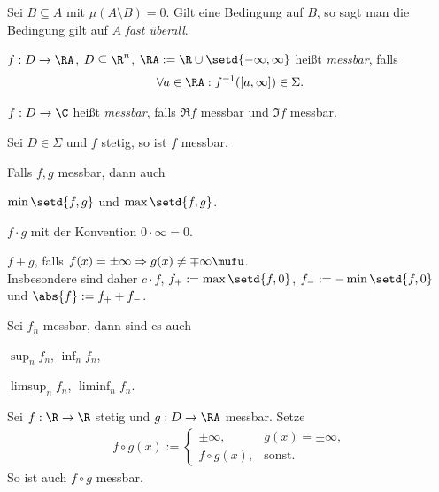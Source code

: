 \begin{defn}
\label{defn:7.8}
Sei $B\subseteq A$ mit $\mu(A\setminus B) = 0$. Gilt eine Bedingung auf $B$, so
sagt man die Bedingung gilt auf $A$ \emph{fast überall}.\fishhere
\end{defn}

\begin{defn}
\label{defn:7.9}
\begin{defnenum}
\item $f: D\to \RA$, $D\subseteq \R^n$, $\RA:=\R\cup\setd{-\infty,\infty}$
heißt \emph{messbar}, falls
\begin{align*}
\forall a\in\RA : f^{-1}([a,\infty]) \in \Sigma.
\end{align*}
\item $f: D\to \C$ heißt \emph{messbar}, falls $\Re f$ messbar und $\Im f$
messbar.\fishhere
\end{defnenum}
\end{defn}

\begin{prop}
\label{prop:7.10}
\begin{propenum}
\item Sei $D\in\Sigma$ und $f$ stetig, so ist $f$ messbar.
\item Falls $f,g$ messbar, dann auch
\begin{defnenum}
\item $\min\setd{f,g}$ und $\max\setd{f,g}$.
\item $f\cdot g$ mit der Konvention $0\cdot \infty = 0$.
\item $f+g$, falls $f(x) = \pm\infty \Rightarrow g(x)\neq \mp \infty \mufu$.\\
Insbesondere sind daher $c\cdot f$, $f_+:=\max\setd{f,0}$, $f_-:=
-\min\setd{f,0}$ und $\abs{f}:= f_++f_-$.
\end{defnenum}
\item Sei $f_n$ messbar, dann sind es auch
\begin{defnenum}
\item $\sup_n f_n$, $\inf_n f_n$,
\item $\limsup_n f_n$, $\liminf_n f_n$.
\end{defnenum}
\item Sei $f:\R\to\R$ stetig und $g: D\to\RA$ messbar. Setze
\begin{align*}
f\circ g(x) :=
\begin{cases}
\pm \infty, & g(x) = \pm\infty,\\
f\circ g(x),& \text{sonst}.
\end{cases}
\end{align*}
So ist auch $f\circ g$ messbar.\fishhere
\end{propenum}
\end{prop}

